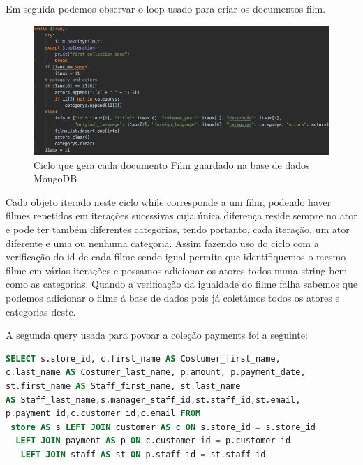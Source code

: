 \par Em seguida podemos observar o loop usado para criar os documentos film.\newline
\begin{figure}[H]

  \centering

  \includegraphics[scale = 0.45]{ciclo.png}

  \caption {Ciclo que gera cada documento Film guardado na base de dados MongoDB}

  \label {fig1}

\end{figure}

\par Cada objeto iterado neste ciclo while corresponde a um film, podendo haver filmes repetidos em iterações sucessivas cuja única diferença reside sempre no ator e pode ter também diferentes categorias, tendo portanto, cada iteração, um ator diferente e uma ou nenhuma categoria. Assim fazendo uso do ciclo com a verificação do id de cada filme sendo igual permite que identifiquemos o mesmo filme em várias iterações e possamos adicionar os atores todos numa string bem como as categorias. Quando a verificação da igualdade do filme falha sabemos que podemos adicionar o filme á base de dados pois já coletámos todos os atores e categorias deste.

A segunda query usada para povoar a coleção payments foi a seguinte:

\begin{lstlisting}[language=sql,caption=Query para povoar a segunda coleção]
SELECT s.store_id, c.first_name AS Costumer_first_name,
c.last_name AS Costumer_last_name, p.amount, p.payment_date, 
st.first_name AS Staff_first_name, st.last_name  
AS Staff_last_name,s.manager_staff_id,st.staff_id,st.email,
p.payment_id,c.customer_id,c.email FROM 
 store AS s LEFT JOIN customer AS c ON s.store_id = s.store_id 
  LEFT JOIN payment AS p ON c.customer_id = p.customer_id 
   LEFT JOIN staff AS st ON p.staff_id = st.staff_id
\end{lstlisting}

